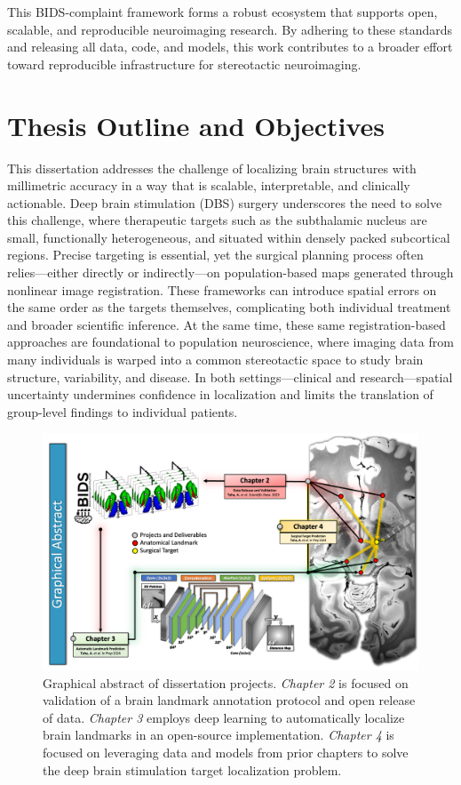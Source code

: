 This BIDS-complaint framework forms a robust ecosystem that supports open, scalable, and reproducible neuroimaging research. By adhering to these standards and releasing all data, code, and models, this work contributes to a broader effort toward reproducible infrastructure for stereotactic neuroimaging.

\section{Thesis Outline and Objectives}

This dissertation addresses the challenge of localizing brain structures with millimetric accuracy in a way that is scalable, interpretable, and clinically actionable. Deep brain stimulation (DBS) surgery underscores the need to solve this challenge, where therapeutic targets such as the subthalamic nucleus are small, functionally heterogeneous, and situated within densely packed subcortical regions. Precise targeting is essential, yet the surgical planning process often relies—either directly or indirectly—on population-based maps generated through nonlinear image registration. These frameworks can introduce spatial errors on the same order as the targets themselves, complicating both individual treatment and broader scientific inference. At the same time, these same registration-based approaches are foundational to population neuroscience, where imaging data from many individuals is warped into a common stereotactic space to study brain structure, variability, and disease. In both settings—clinical and research—spatial uncertainty undermines confidence in localization and limits the translation of group-level findings to individual patients.

\begin{figure}[hbt!]
    \centering
    \includegraphics[width=1\linewidth]{figs/ch1_Figure_Abstract.png}
    \caption{Graphical abstract of dissertation projects. \textit{Chapter 2} is focused on validation of a brain landmark annotation protocol and open release of data. \textit{Chapter 3} employs deep learning to automatically localize brain landmarks in an open-source implementation. \textit{Chapter 4} is focused on leveraging data and models from prior chapters to solve the deep brain stimulation target localization problem.}
    \label{fig:Abstract}
\end{figure}


